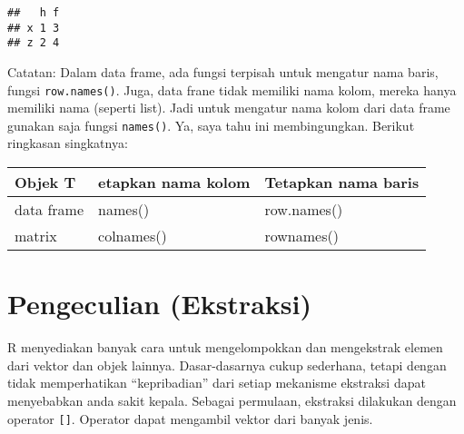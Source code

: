 \documentclass[
]{book}
\begin{document}
\begin{verbatim}
##   h f
## x 1 3
## z 2 4
\end{verbatim}

Catatan: Dalam data frame, ada fungsi terpisah untuk mengatur nama baris, fungsi \texttt{row.names()}. Juga, data frane tidak memiliki nama kolom, mereka hanya memiliki nama (seperti list). Jadi untuk mengatur nama kolom dari data frame gunakan saja fungsi \texttt{names()}. Ya, saya tahu ini membingungkan. Berikut ringkasan singkatnya:

\begin{longtable}[]{@{}lll@{}}
\toprule
Objek T & etapkan nama kolom & Tetapkan nama baris\tabularnewline
\midrule
\endhead
data frame & names() & row.names()\tabularnewline
matrix & colnames() & rownames()\tabularnewline
\bottomrule
\end{longtable}

\hypertarget{pengeculian-ekstraksi}{%
\section{Pengeculian (Ekstraksi)}\label{pengeculian-ekstraksi}}

R menyediakan banyak cara untuk mengelompokkan dan mengekstrak elemen dari vektor dan objek lainnya. Dasar-dasarnya cukup sederhana, tetapi dengan tidak memperhatikan ``kepribadian'' dari setiap mekanisme ekstraksi dapat menyebabkan anda sakit kepala. Sebagai permulaan, ekstraksi dilakukan dengan operator \texttt{{[}{]}}. Operator dapat mengambil vektor dari banyak jenis.
\end{document}
